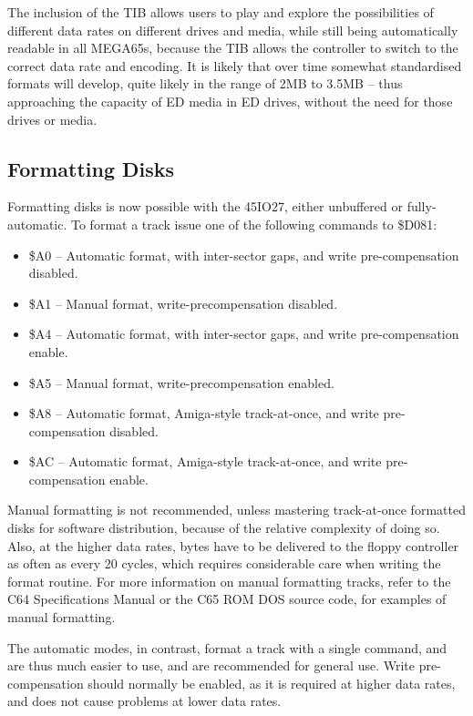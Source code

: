 The inclusion of the TIB allows users to play and explore the possibilities of different data rates
on different drives and media, while still being automatically readable in all MEGA65s, because the
TIB allows the controller to switch to the correct data rate and encoding.  It is likely that over
time somewhat standardised formats will develop, quite likely in the range of 2MB to 3.5MB -- thus
approaching the capacity of ED media in ED drives, without the need for those drives or media.

\subsection{Formatting Disks}

Formatting disks is now possible with the 45IO27, either unbuffered or fully-automatic.
To format a track issue one of the following commands to \$D081:

\begin{itemize}
\item \$A0 -- Automatic format, with inter-sector gaps, and write pre-compensation disabled.
\item \$A1 -- Manual format, write-precompensation disabled.
\item \$A4 -- Automatic format, with inter-sector gaps, and write pre-compensation enable.
\item \$A5 -- Manual format, write-precompensation enabled.
\item \$A8 -- Automatic format, Amiga-style track-at-once, and write pre-compensation disabled.
\item \$AC -- Automatic format, Amiga-style track-at-once, and write pre-compensation enable.
\end{itemize}  
  
Manual formatting is not recommended, unless mastering track-at-once formatted disks for software
distribution, because of the relative complexity of doing so. Also, at the higher data rates,
bytes have to be delivered to the floppy controller as often as every 20 cycles, which requires
considerable care when writing the format routine.
For more information on manual formatting tracks, refer to the C64 Specifications Manual or the
C65 ROM DOS source code, for examples of manual formatting.

The automatic modes, in contrast, format a track with a single command, and are thus much easier to use,
and are recommended for general use.  Write pre-compensation should normally be enabled, as it is
required at higher data rates, and does not cause problems at lower data rates.

